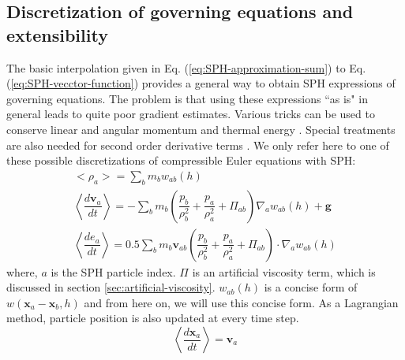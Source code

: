 \documentclass[gmd, manuscript]{copernicus}
\begin{document}
\subsection{Discretization of governing equations and extensibility}
The basic interpolation given in Eq. (\ref{eq:SPH-approximation-sum}) to Eq. (\ref{eq:SPH-vecctor-function}) provides a general way to obtain SPH expressions of governing equations. The problem is that using these expressions ``{as is}" in general leads to quite poor gradient estimates. Various tricks can be used to conserve linear and angular momentum and thermal energy \citep{monaghan1992smoothed}. Special treatments are also needed for second order derivative terms \citep{monaghan2005smoothed}. We only refer here to one of these possible discretizations of compressible Euler equations with SPH:
\begin{align}
<\rho_a> = \sum_b m_b w_{ab} \left(h\right) \label{eq:ns-sph-d} \\
\left\langle\dfrac{d \textbf{v}_a}{d t}\right\rangle = -\sum_b m_b \left(\dfrac{p_b}{\rho_b^2} + \dfrac{p_a}{\rho_a^2} + \Pi_{ab}\right) \nabla_a w_{a b}\left(h\right) +\textbf{g} \label{eq:ns-sph-v} \\
\left\langle\dfrac{d e_a}{d t}\right\rangle=
 0.5\sum_b m_b \textbf{v}_{a b}\left(\dfrac{p_b}{\rho_b^2} + \dfrac{p_a}{\rho_a^2} + \Pi_{ab}\right) \cdot \nabla_a w_{a b}\left(h\right) \label{eq:ns-sph-e}
\end{align}
where, $a$ is the SPH particle index. $\Pi$ is an artificial viscosity term, which is discussed in section \ref{sec:artificial-viscosity}. $w_{a b}\left(h\right)$ is a concise form of $w\left(\textbf{x}_a - \textbf{x}_b, h\right)$ and from here on, we will use this concise form.
As a Lagrangian method, particle position is also updated at every time step.
\begin{equation}
\left\langle\dfrac{d \textbf{x}_a}{dt}\right\rangle = \textbf{v}_a \label{eq:SPH-update-pos}
\end{equation}
\end{document}
